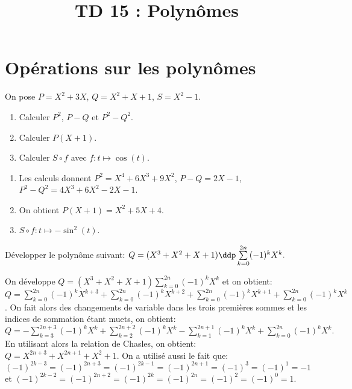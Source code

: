 \documentclass[a4paper, 11pt,reqno]{article}
\begin{document}
\title{TD 15 : Polynômes}


\section{\large{Op\'erations sur les polyn\^omes}}
\begin{exercice}  \;
	On pose $P=X^2+3X$, $Q=X^2+X+1$, $S=X^2-1$.
	\begin{enumerate}
		\item Calculer $P^2$, $P-Q$ et $P^2-Q^2$.
		\item Calculer $P(X+1)$.
		\item Calculer $S\circ f$ avec $f: t\mapsto \cos{(t)}$.
	\end{enumerate}
\end{exercice}

\begin{correction}  \;
	\begin{enumerate}
		\item Les calculs donnent $P^2=X^4+6X^3+9X^2$, $P-Q=2X-1$, $P^2-Q^2=4X^3+6X^2-2X-1$.
		\item On obtient $P(X+1)=X^2+5X+4$.
		\item $S\circ f : t \mapsto -\sin^2(t) $.
	\end{enumerate}
\end{correction}



\begin{exercice}
	D\'evelopper le polyn\^ome suivant: $Q=(X^3+X^2+X+1)\ddp \sum\limits_{k=0}^{2n} (-1)^kX^k.$
\end{exercice}

\begin{correction}
	On d\'eveloppe $Q=(X^3+X^2+X+1)\sum\limits_{k=0}^{2n} (-1)^kX^k$ et on obtient:\\
	\noindent $Q=\sum\limits_{k=0}^{2n} (-1)^kX^{k+3}+\sum\limits_{k=0}^{2n} (-1)^kX^{k+2}+\sum\limits_{k=0}^{2n} (-1)^kX^{k+1}+\sum\limits_{k=0}^{2n} (-1)^kX^{k}$. On fait alors des changements de variable dans les trois premi\`{e}res sommes et les indices de sommation \'etant muets, on obtient:\\
	\noindent $Q=-\sum\limits_{k=3}^{2n+3} (-1)^kX^k+\sum\limits_{k=2}^{2n+2} (-1)^kX^k-\sum\limits_{k=1}^{2n+1} (-1)^kX^k+\sum\limits_{k=0}^{2n} (-1)^kX^k.$ En utilisant alors la relation de Chasles, on obtient:
	$Q=X^{2n+3}+X^{2n+1}+X^2+1$. On a utilis\'e aussi le fait que: $(-1)^{2k-3}=(-1)^{2n+3}=(-1)^{2k-1}=(-1)^{2n+1}=(-1)^3=(-1)^1=-1$ et $(-1)^{2k-2}=(-1)^{2n+2}=(-1)^{2k}=(-1)^{2n}=(-1)^2=(-1)^0=1$.
\end{correction}
\end{document}
